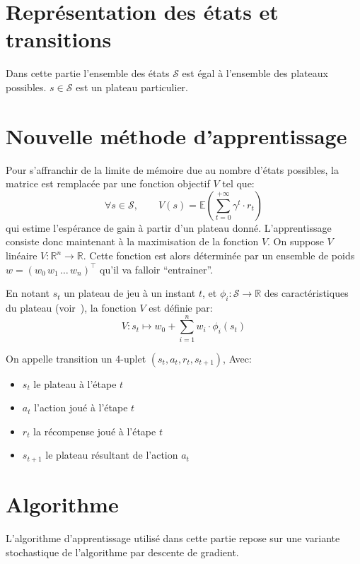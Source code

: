 \documentclass{report}
\newcommand{\R}{\mathbb{R}}
\begin{document}
\section{Représentation des états et transitions}

Dans cette partie l'ensemble des états \( \mathcal{S} \) est égal à l'ensemble
des plateaux possibles. \( s \in \mathcal{S} \) est un plateau particulier.

\section{Nouvelle méthode d'apprentissage}

Pour s'affranchir de la limite de mémoire due au nombre d'états possibles, la
matrice est remplacée par une fonction objectif \( V \) tel que:
\[
  \forall s \in \mathcal{S}, \qquad V(s) =
  \mathbb{E}\left(\sum_{t=0}^{+\infty} \gamma ^t \cdot r_t\right)
\]
qui estime l'espérance de gain à partir d'un plateau donné.
L'apprentissage consiste donc maintenant à la maximisation de la
fonction \( V \).
On suppose \( V \) linéaire \(V \colon \R^n \to \R\). Cette fonction est alors
déterminée par un ensemble de poids \(w = (w_0\, w_1\, \dots\, w_n)^\top\)
qu'il va falloir ``entrainer''.

En notant \( s_t \) un plateau de jeu à un instant \( t \), et
\(\phi_i\colon \mathcal{S} \to \R\) des caractéristiques du plateau
(voir~\cite{boumaza13}), la fonction \(V\)
est définie par:
\[
  V \colon s_t \mapsto w_0 + \sum_{i=1}^n w_i \cdot \phi_i (s_t)
\]

On appelle transition un 4-uplet \( (s_t, a_t, r_t, s_{t+1}) \), Avec:
\begin{itemize}
    \item \( s_t \) le plateau à l'étape \( t \)
    \item \( a_t \) l'action joué à l'étape \( t \)
    \item \( r_t \) la récompense joué à l'étape \( t \)
    \item \( s_{t+1} \) le plateau résultant de l'action \( a_t \)
\end{itemize}


\section{Algorithme}

L'algorithme d'apprentissage utilisé dans cette partie repose sur une variante
stochastique de l'algorithme par descente de gradient.
\end{document}
